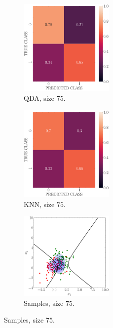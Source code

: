\documentclass[12pt, a4 paper]{article}
\begin{document}
\begin{figure}[!htbp]
\quad \quad
    \begin{subfigure}[!htbp]{0.24\textwidth}
       \centering
       \includegraphics[width=1.8in]{../results/ex1/conf_mtx_QD_ML_dataset_P1a_size_75.pdf}
       \caption{QDA, size $75$.}
       \label{fig:QDA_P1a_75}
    \end{subfigure}
\quad \quad
    \begin{subfigure}[!htbp]{0.24\textwidth}
       \centering
       \includegraphics[width=1.8in]{../results/ex1/conf_mtx_KNN_dataset_P1a_size_75.pdf}
       \caption{KNN, size $75$.}
       \label{fig:KNN_P1a_75}
    \end{subfigure}
\quad \quad
    \begin{subfigure}[!htbp]{0.24\textwidth}
       \centering
       \includegraphics[width=1.8in]{../results/ex1/samples_QD_ML_dataset_P1a_size_75.pdf}
       \caption{Samples, size $75$.}
       \label{fig:DF_P1a_75}
    \end{subfigure}
    

\end{figure}
\end{document}

